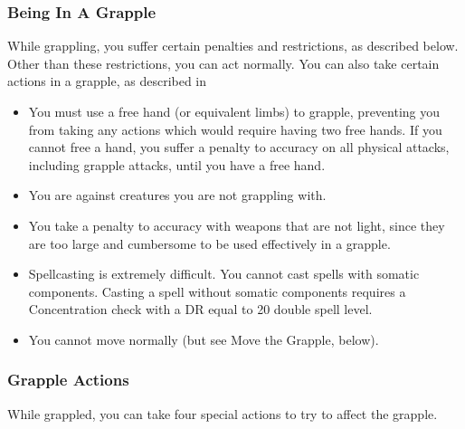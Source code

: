         \subsubsection{Being In A Grapple}
            While grappling, you suffer certain penalties and restrictions, as described below. Other than these restrictions, you can act normally. You can also take certain actions in a grapple, as described in 
            \begin{itemize}
                \item You must use a free hand (or equivalent limbs) to grapple, preventing you from taking any actions which would require having two free hands. If you cannot free a hand, you suffer a  penalty to accuracy on all physical attacks, including grapple attacks, until you have a free hand.
                \item You are  against creatures you are not grappling with.
                \item You take a  penalty to accuracy with weapons that are not light, since they are too large and cumbersome to be used effectively in a grapple.
                \item Spellcasting is extremely difficult. You cannot cast spells with somatic components. Casting a spell without somatic components requires a Concentration check with a DR equal to 20 \add double spell level.
                \item You cannot move normally (but see Move the Grapple, below).
            \end{itemize}

        \subsubsection{Grapple Actions}\label{Grapple Actions}
            While grappled, you can take four special actions to try to affect the grapple.

